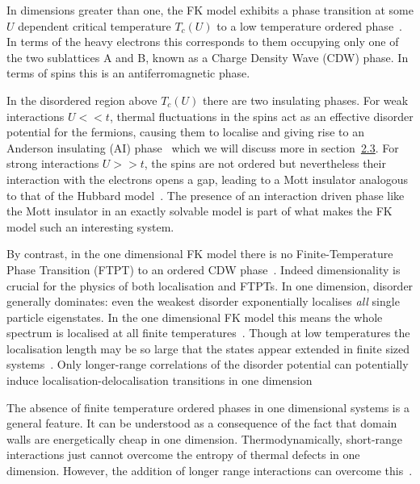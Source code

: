In dimensions greater than one, the FK model exhibits a phase transition at some \(U\) dependent critical temperature \(T_c(U)\) to a low temperature ordered phase~\autocite{maskaThermodynamicsTwodimensionalFalicovKimball2006}. In terms of the heavy electrons this corresponds to them occupying only one of the two sublattices A and B, known as a Charge Density Wave (CDW) phase. In terms of spins this is an antiferromagnetic phase.

In the disordered region above \(T_c(U)\) there are two insulating phases. For weak interactions \(U << t\), thermal fluctuations in the spins act as an effective disorder potential for the fermions, causing them to localise and giving rise to an Anderson insulating (AI) phase~\autocite{andersonAbsenceDiffusionCertain1958} which we will discuss more in section~\protect\hyperlink{bg-disorder-and-localisation}{2.3}. For strong interactions \(U >> t\), the spins are not ordered but nevertheless their interaction with the electrons opens a gap, leading to a Mott insulator analogous to that of the Hubbard model~\autocite{brandtThermodynamicsCorrelationFunctions1989}. The presence of an interaction driven phase like the Mott insulator in an exactly solvable model is part of what makes the FK model such an interesting system.

By contrast, in the one dimensional FK model there is no Finite-Temperature Phase Transition (FTPT) to an ordered CDW phase~\autocite{liebAbsenceMottTransition1968}. Indeed dimensionality is crucial for the physics of both localisation and FTPTs. In one dimension, disorder generally dominates: even the weakest disorder exponentially localises \emph{all} single particle eigenstates. In the one dimensional FK model this means the whole spectrum is localised at all finite temperatures~\autocite{goldshteinPurePointSpectrum1977,abrahamsScalingTheoryLocalization1979,kramerLocalizationTheoryExperiment1993}. Though at low temperatures the localisation length may be so large that the states appear extended in finite sized systems~\autocite{antipovInteractionTunedAndersonMott2016}. Only longer-range correlations of the disorder potential can potentially induce localisation-delocalisation transitions in one dimension~\autocite{aubryAnalyticityBreakingAnderson1980,dassarmaLocalizationMobilityEdges1990,dunlapAbsenceLocalizationRandomdimer1990}

The absence of finite temperature ordered phases in one dimensional systems is a general feature. It can be understood as a consequence of the fact that domain walls are energetically cheap in one dimension. Thermodynamically, short-range interactions just cannot overcome the entropy of thermal defects in one dimension. However, the addition of longer range interactions can overcome this~\autocite{peierlsIsingModelFerromagnetism1936,kennedyItinerantElectronModel1986}.

